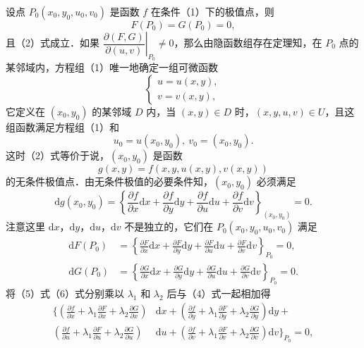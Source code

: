 设点 $P_{0}(x_{0},y_{0},u_{0},v_{0})$ 是函数 $f$ 在条件（1）下的极值点，则
\begin{equation}
F(P_{0})=G(P_{0})=0,
\tag{3}
\end{equation}
且（2）式成立．如果 $\left.\dfrac{\partial(F,G)}{\partial(u,v)}\right|_{P_{0}}\neq0$，那么由隐函数组存在定理知，在 $P_{0}$ 点的某邻域内，方程组（1）唯一地确定一组可微函数
\[
\begin{cases}
u=u(x,y),\\
v=v(x,y),
\end{cases}
\]
它定义在 $(x_{0},y_{0})$ 的某邻域 $D$ 内，当 $(x,y)\in D$ 时，$(x,y,u,v)\in U$，且这组函数满足方程组（1）和
\[
u_{0}=u(x_{0},y_{0}),\ v_{0}=(x_{0},y_{0}).
\]
这时（2）式等价于说，$(x_{0},y_{0})$ 是函数
\[
g(x,y)=f(x,y,u(x,y),v(x,y))
\]
的无条件极值点．由无条件极值的必要条件知，$(x_{0},y_{0})$ 必须满足
\begin{equation}
\mathrm{d}g(x_{0},y_{0})=\left\{\frac{\partial f}{\partial x}\mathrm{d}x+\frac{\partial f}{\partial y}\mathrm{d}y+\frac{\partial f}{\partial u}\mathrm{d}u+\frac{\partial f}{\partial v}\mathrm{d}v\right\}_{(x_{0},y_{0})}=0.
\tag{4}
\end{equation}
注意这里 $\mathrm{d}x$，$\mathrm{d}y$，$\mathrm{d}u$，$\mathrm{d}v$ 不是独立的，它们在 $P_{0}(x_{0},y_{0},u_{0},v_{0})$ 满足
\begin{align}
\mathrm{d}F(P_{0})&=\left\{\frac{\partial F}{\partial x}\mathrm{d}x+\frac{\partial F}{\partial y}\mathrm{d}y+\frac{\partial F}{\partial u}\mathrm{d}u+\frac{\partial F}{\partial v}\mathrm{d}v\right\}_{P_{0}}=0,
\tag{5}\\
\mathrm{d}G(P_{0})&=\left\{\frac{\partial G}{\partial x}\mathrm{d}x+\frac{\partial G}{\partial y}\mathrm{d}y+\frac{\partial G}{\partial u}\mathrm{d}u+\frac{\partial G}{\partial v}\mathrm{d}v\right\}_{P_{0}}=0.
\tag{6}
\end{align}
将（5）式（6）式分别乘以 $\lambda_{1}$ 和 $\lambda_{2}$ 后与（4）式一起相加得
\begin{equation}
\begin{aligned}
\bigg\{\left(\frac{\partial f}{\partial x}+\lambda_{1}\frac{\partial F}{\partial x}+\lambda_{2}\frac{\partial G}{\partial x}\right)&\mathrm{d}x+\left(\frac{\partial f}{\partial y}+\lambda_{1}\frac{\partial F}{\partial y}+\lambda_{2}\frac{\partial G}{\partial y}\right)\mathrm{d}y+\\
\left(\frac{\partial f}{\partial u}+\lambda_{1}\frac{\partial F}{\partial u}+\lambda_{2}\frac{\partial G}{\partial u}\right)&\mathrm{d}u+\left(\frac{\partial f}{\partial v}+\lambda_{1}\frac{\partial F}{\partial v}+\lambda_{2}\frac{\partial G}{\partial v}\right)\mathrm{d}v\bigg\}_{P_{0}}=0,
\end{aligned}
\tag{7}
\end{equation}
